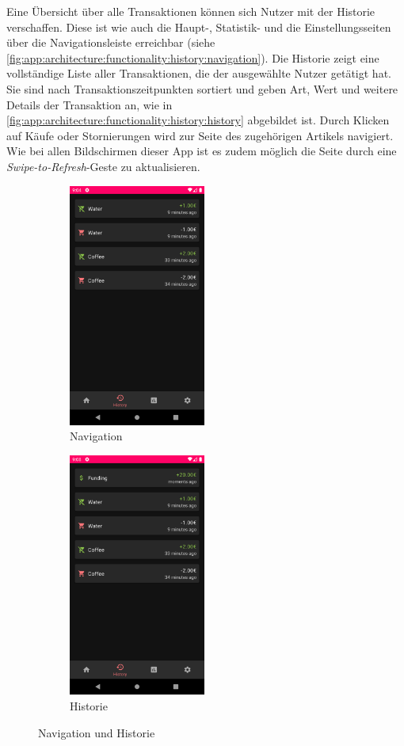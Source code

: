 \documentclass[a4paper, 11pt]{article}
\begin{document}
Eine Übersicht über alle Transaktionen können sich Nutzer mit der Historie verschaffen.
Diese ist wie auch die Haupt-, Statistik- und die Einstellungsseiten über die Navigationsleiste erreichbar (siehe \autoref{fig:app:architecture:functionality:history:navigation}).
Die Historie zeigt eine vollständige Liste aller Transaktionen, die der ausgewählte Nutzer getätigt hat.
Sie sind nach Transaktionszeitpunkten sortiert und geben Art, Wert und weitere Details der Transaktion an, wie in \autoref{fig:app:architecture:functionality:history:history} abgebildet ist.
Durch Klicken auf Käufe oder Stornierungen wird zur Seite des zugehörigen Artikels navigiert.
Wie bei allen Bildschirmen dieser App ist es zudem möglich die Seite durch eine \textit{Swipe-to-Refresh}-Geste zu aktualisieren.
\begin{figure}[]
	\begin{subfigure}{.5\textwidth}
		\centering
		\includegraphics[height=8cm,keepaspectratio]{./images/screenshots/navigation.png}
		\caption{Navigation}
		\label{fig:app:architecture:functionality:history:navigation}
	\end{subfigure}
	\begin{subfigure}{.5\textwidth}
		\centering
		\includegraphics[height=8cm,keepaspectratio]{./images/screenshots/history.png}
		\caption{Historie}
		\label{fig:app:architecture:functionality:history:history}
	\end{subfigure}
	\caption{Navigation und Historie}
	\label{fig:app:architecture:functionality:history}
\end{figure}
\end{document}
